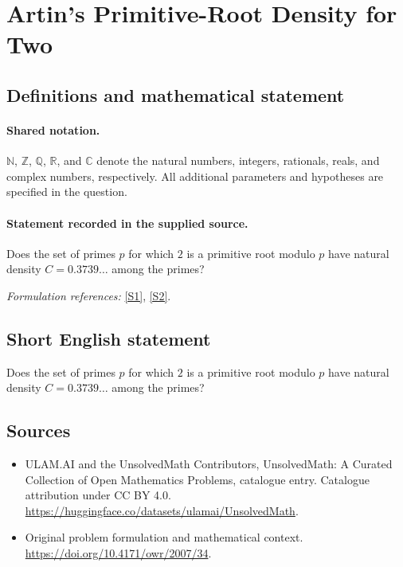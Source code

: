 \documentclass[11pt]{article}
\newcommand{\sref}[2]{\hyperlink{source:#1:#2}{[S#2]}}
\begin{document}
\section{Artin’s Primitive-Root Density for Two}\label{statement}

\subsection{Definitions and mathematical statement}

\paragraph{Shared notation.}$\mathbb N$, $\mathbb Z$, $\mathbb Q$, $\mathbb R$, and $\mathbb C$ denote the natural numbers, integers, rationals, reals, and complex numbers, respectively. All additional parameters and hypotheses are specified in the question.


\paragraph{Statement recorded in the supplied source.}
Does the set of primes $p$ for which $2$ is a primitive root modulo $p$ have natural density $C=0.3739\ldots$ among the primes?
\par\smallskip\textit{Formulation references:} \sref{statement}{1}, \sref{statement}{2}.
\subsection{Short English statement}
Does the set of primes $p$ for which $2$ is a primitive root modulo $p$ have natural density $C=0.3739\ldots$ among the primes?
\subsection{Sources}
\begin{itemize}
\item[\hypertarget{source:statement:1}{S1}] ULAM.AI and the UnsolvedMath Contributors, UnsolvedMath: A Curated Collection of Open Mathematics Problems, catalogue entry. Catalogue attribution under CC BY 4.0.
\url{https://huggingface.co/datasets/ulamai/UnsolvedMath}.
\item[\hypertarget{source:statement:2}{S2}] Original problem formulation and mathematical context.
\url{https://doi.org/10.4171/owr/2007/34}.
\end{itemize}
\label{end:statement}
\end{document}
